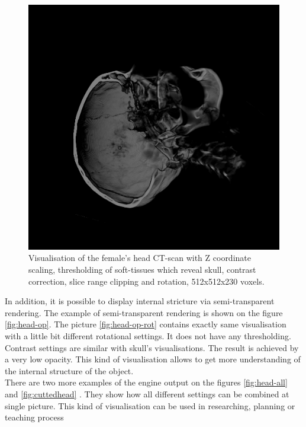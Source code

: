 \documentclass[twoside, english, 11pt]{report}
\begin{document}
\begin{figure}[H]
\centerline{\includegraphics[scale = 0.7]{img/head-clip-rot}}
\caption{Visualisation of the female's head CT-scan with Z coordinate scaling, thresholding of soft-tissues which reveal skull, contrast correction, slice range clipping and rotation, 512x512x230 voxels.\label{fig:head-clip-rot}}
\end{figure}

In addition, it is possible to display internal stricture via semi-transparent rendering. The example of semi-transparent rendering is shown on the figure \ref{fig:head-op}. The picture \ref{fig:head-op-rot} contains exactly same visualisation with a little bit different rotational settings. It does not have any thresholding. Contrast settings are similar with skull's visualisations. The result is achieved by a very low opacity. This kind of visualisation allows to get more understanding of the internal structure of the object.\\

There are two more examples of the engine output on the figures \ref{fig:head-all} and \ref{fig:cuttedhead} . They show how all different settings can be combined at single picture. This kind of visualisation can be used in researching, planning or teaching process
\end{document}
